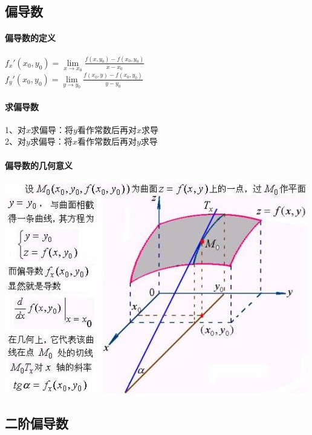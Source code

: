 \documentclass{article}
\begin{document}
\begin{flushleft}
	\subsection{偏导数}
	\paragraph{偏导数的定义}
	$f_x'(x_0,y_0)=\lim\limits_{x\to x_0}\frac{f(x,y_0)-f(x_0,y_0)}{x-x_0}$\\
	$f_y'(x_0,y_0)=\lim\limits_{y\to y_0}\frac{f(x_0,y)-f(x_0,y_0)}{y-y_0}$\\
	
	\paragraph{求偏导数}
	1、对$x$求偏导：将$y$看作常数后再对$x$求导\\
	2、对$y$求偏导：将$x$看作常数后再对$y$求导\\
	
	\paragraph{偏导数的几何意义}
	\includegraphics[scale=1.0]{pdsjhyy.jpg}
	
	\subsection{二阶偏导数}
	

\end{flushleft}
\end{document}
